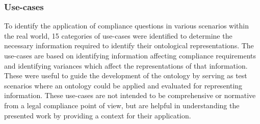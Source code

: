 \subsubsection{Use-cases}\label{sec:info:use-cases}
To identify the application of compliance questions in various scenarios within the real world, 15 categories of use-cases were identified to determine the necessary information required to identify their ontological representations.
The use-cases are based on identifying information affecting compliance requirements and identifying variances which affect the representations of that information.
These were useful to guide the development of the ontology by serving as test scenarios where an ontology could be applied and evaluated for representing information.
These use-cases are not intended to be comprehensive or normative from a legal compliance point of view, but are helpful in understanding the presented work by providing a context for their application.

